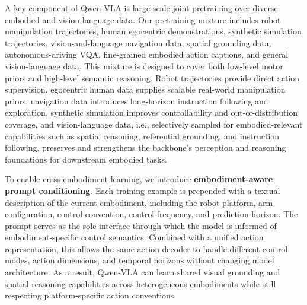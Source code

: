 \documentclass{article}
\begin{document}
A key component of Qwen-VLA is large-scale joint pretraining over diverse embodied and vision-language data. Our pretraining mixture includes robot manipulation trajectories, human egocentric demonstrations, synthetic simulation trajectories, vision-and-language navigation data, spatial grounding data, autonomous-driving VQA, fine-grained embodied action captions, and general vision-language data. This mixture is designed to cover both low-level motor priors and high-level semantic reasoning. Robot trajectories provide direct action supervision, egocentric human data supplies scalable real-world manipulation priors, navigation data introduces long-horizon instruction following and exploration, synthetic simulation improves controllability and out-of-distribution coverage, and vision-language data, i.e., selectively sampled for embodied-relevant capabilities such as spatial reasoning, referential grounding, and instruction following, preserves and strengthens the backbone's perception and reasoning foundations for downstream embodied tasks.

To enable cross-embodiment learning, we introduce \textbf{embodiment-aware prompt conditioning}. Each training example is prepended with a textual description of the current embodiment, including the robot platform, arm configuration, control convention, control frequency, and prediction horizon. The prompt serves as the sole interface through which the model is informed of embodiment-specific control semantics. Combined with a unified action representation, this allows the same action decoder to handle different control modes, action dimensions, and temporal horizons without changing model architecture. As a result, Qwen-VLA can learn shared visual grounding and spatial reasoning capabilities across heterogeneous embodiments while still respecting platform-specific action conventions.

  
\end{document}
